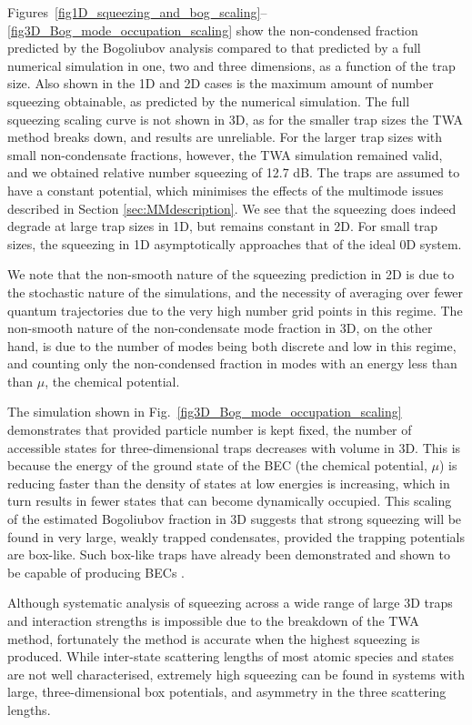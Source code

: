 \documentclass{iopart}
\begin{document}
Figures~\ref{fig1D_squeezing_and_bog_scaling}--\ref{fig3D_Bog_mode_occupation_scaling} show the non-condensed fraction predicted by the Bogoliubov analysis compared to that predicted by a full numerical simulation in one, two and three dimensions, as a function of the trap size. Also shown in the 1D and 2D cases is the maximum amount of number squeezing obtainable, as predicted by the numerical simulation. The full squeezing scaling curve is not shown in 3D, as for the smaller trap sizes the TWA method breaks down, and results are unreliable. For the larger trap sizes with small non-condensate fractions, however, the TWA simulation remained valid, and we obtained relative number squeezing of 12.7 dB. The traps are assumed to have a constant potential, which minimises the effects of the multimode issues described in Section \ref{sec:MMdescription}.  We see that the squeezing does indeed degrade at large trap sizes in 1D, but remains constant in 2D. For small trap sizes, the squeezing in 1D asymptotically approaches that of the ideal 0D system.

We note that the non-smooth nature of the squeezing prediction in 2D is due to the stochastic nature of the simulations, and the necessity of averaging over fewer quantum trajectories due to the very high number grid points in this regime. The non-smooth nature of the non-condensate mode fraction in 3D, on the other hand, is due to the number of modes being both discrete and low in this regime, and counting only the non-condensed fraction in modes with an energy less than than $\mu$, the chemical potential.

The simulation shown in Fig.~\ref{fig3D_Bog_mode_occupation_scaling} demonstrates that provided particle number is kept fixed, the number of accessible states for three-dimensional traps decreases with volume in 3D.  This is because the energy of the ground state of the BEC (the chemical potential, $\mu$) is reducing faster than the density of states at low energies is increasing, which in turn results in fewer states that can become dynamically occupied.  This scaling of the estimated Bogoliubov fraction in 3D suggests that strong squeezing will be found in very large, weakly trapped condensates, provided the trapping potentials are box-like. Such box-like traps have already been demonstrated and shown to be capable of producing BECs \cite{gaunt2013}.

Although systematic analysis of squeezing across a wide range of large 3D traps and interaction strengths is impossible due to the breakdown of the TWA method, fortunately the method is accurate when the highest squeezing is produced.  While inter-state scattering lengths of most atomic species and states are not well characterised, extremely high squeezing can be found in systems with large, three-dimensional box potentials, and asymmetry in the three scattering lengths.
\end{document}
